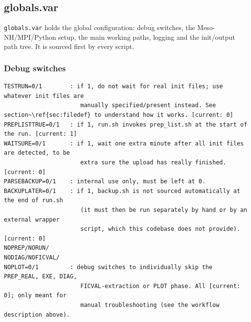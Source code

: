 \subsection{globals.var}
\texttt{globals.var} holds the global configuration: debug switches, the Meso-NH/MPI/Python setup, the
main working paths, logging and the init/output path tree. It is sourced first by every script.

\subsubsection{Debug switches}
\begin{lstlisting}
TESTRUN=0/1        : if 1, do not wait for real init files; use whatever init files are
                      manually specified/present instead. See section~\ref{sec:filedef} to understand how it works. [current: 0]
PREPLISTTRUE=0/1   : if 1, run.sh invokes prep_list.sh at the start of the run. [current: 1]
WAITSURE=0/1       : if 1, wait one extra minute after all init files are detected, to be
                      extra sure the upload has really finished. [current: 0]
PARSEBACKUP=0/1    : internal use only, must be left at 0.
BACKUPLATER=0/1    : if 1, backup.sh is not sourced automatically at the end of run.sh
                      (it must then be run separately by hand or by an external wrapper
                      script, which this codebase does not provide). [current: 0]
NOPREP/NORUN/
NODIAG/NOFICVAL/
NOPLOT=0/1         : debug switches to individually skip the PREP_REAL, EXE, DIAG,
                      FICVAL-extraction or PLOT phase. All [current: 0]; only meant for
                      manual troubleshooting (see the workflow description above).
\end{lstlisting}

